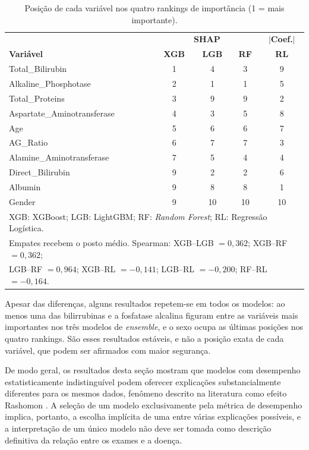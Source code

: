 \begin{table}[htbp]
\centering
\begin{tabular}{lcccc}
\hline
 & \multicolumn{3}{c}{\textbf{SHAP}} & \textbf{$|$Coef.$|$} \\
\textbf{Variável} & \textbf{XGB} & \textbf{LGB} & \textbf{RF} & \textbf{RL} \\
\hline
Total\_Bilirubin            & 1 & 4  & 3  & 9 \\
Alkaline\_Phosphotase       & 2 & 1  & 1  & 5 \\
Total\_Proteins             & 3 & 9  & 9  & 2 \\
Aspartate\_Aminotransferase & 4 & 3  & 5  & 8 \\
Age                         & 5 & 6  & 6  & 7 \\
AG\_Ratio                   & 6 & 7  & 7  & 3 \\
Alamine\_Aminotransferase   & 7 & 5  & 4  & 4 \\
Direct\_Bilirubin           & 9 & 2  & 2  & 6 \\
Albumin                     & 9 & 8  & 8  & 1 \\
Gender                      & 9 & 10 & 10 & 10 \\
\hline
\multicolumn{5}{l}{\footnotesize XGB: XGBoost; LGB: LightGBM; RF: \textit{Random Forest}; RL: Regressão Logística.} \\
\multicolumn{5}{l}{\footnotesize Empates recebem o posto médio. Spearman: XGB--LGB $= 0{,}362$; XGB--RF $= 0{,}362$;} \\
\multicolumn{5}{l}{\footnotesize LGB--RF $= 0{,}964$; XGB--RL $= -0{,}141$; LGB--RL $= -0{,}200$; RF--RL $= -0{,}164$.} \\
\end{tabular}
\caption{Posição de cada variável nos quatro rankings de importância (1 = mais importante).}
\label{tab:res_rankings}
\end{table}

Apesar das diferenças, alguns resultados repetem-se em todos os modelos: ao menos uma das bilirrubinas e a fosfatase alcalina figuram entre as variáveis mais importantes nos três modelos de \textit{ensemble}, e o sexo ocupa as últimas posições nos quatro rankings. São esses resultados estáveis, e não a posição exata de cada variável, que podem ser afirmados com maior segurança.

De modo geral, os resultados desta seção mostram que modelos com desempenho estatisticamente indistinguível podem oferecer explicações substancialmente diferentes para os mesmos dados, fenômeno descrito na literatura como efeito Rashomon \cite{Biecek2024Performance}. A seleção de um modelo exclusivamente pela métrica de desempenho implica, portanto, a escolha implícita de uma entre várias explicações possíveis, e a interpretação de um único modelo não deve ser tomada como descrição definitiva da relação entre os exames e a doença.

